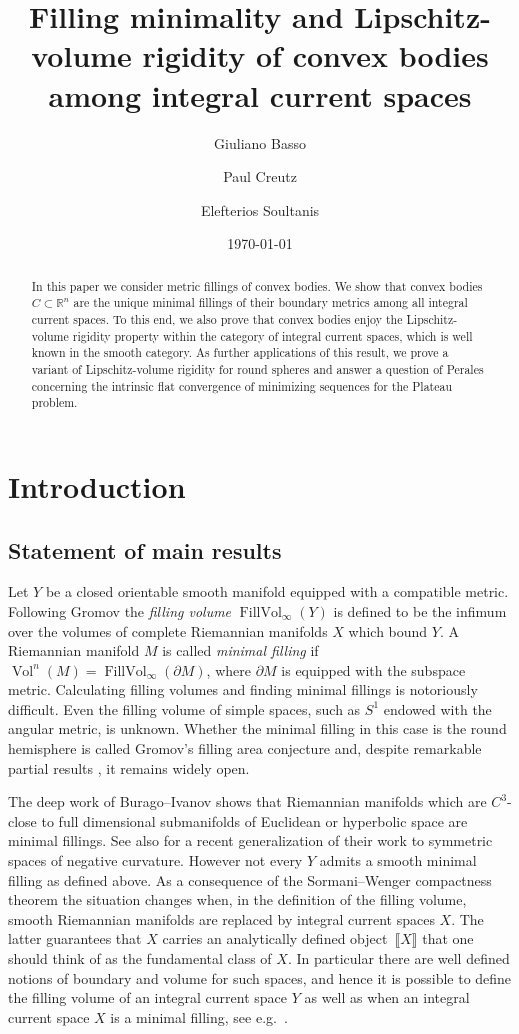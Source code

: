 \documentclass[reqno]{amsart}
\title[Filling minimality and rigidity of convex bodies]{Filling minimality and Lipschitz-volume rigidity of convex bodies among integral current spaces}
\author{Giuliano Basso}
\author{Paul Creutz}
\author{Elefterios Soultanis}
\date{\today}
\numberwithin{equation}{section}
\newcommand{\FillVol}{\operatorname{FillVol}}
\newcommand{\vol}{\operatorname{Vol}}
\newcommand{\bb}[1]{\llbracket #1\rrbracket}
\begin{document}
\begin{abstract}
In this paper we consider metric fillings of convex bodies. We show that convex bodies $C\subset \mathbb{R}^n$ are the unique minimal fillings of their boundary metrics among all integral current spaces. To this end, we also prove that convex bodies enjoy the Lipschitz-volume rigidity property within the category of integral current spaces, which is well known in the smooth category. As further applications of this result, we prove a variant of Lipschitz-volume rigidity for round spheres and answer a question of Perales concerning the intrinsic flat convergence of minimizing sequences for the Plateau problem.
\end{abstract}
\maketitle
\section{Introduction}
\subsection{Statement of main results}\label{sec:intro}
Let $Y$ be a closed orientable smooth manifold equipped with a compatible metric. Following Gromov \cite{gro87} the \emph{filling volume} $\FillVol_\infty(Y)$ is defined to be the infimum over the volumes of complete Riemannian manifolds $X$  which bound $Y$. A Riemannian manifold $M$ is called \emph{minimal filling} if $\vol^n(M)=\FillVol_\infty(\partial M)$, where $\partial M$ is equipped with the subspace metric. Calculating filling volumes and finding minimal fillings is notoriously difficult. Even the filling volume of simple spaces, such as $S^1$ endowed with the angular metric, is unknown. Whether the minimal filling in this case is the round hemisphere is called Gromov's filling area conjecture and, despite  remarkable partial results \cite{BCIK05, pu52, zust2021riemannian}, it remains widely open. 

The deep work of Burago--Ivanov \cite{bi10,bi13} shows that Riemannian manifolds which are $C^3$-close to full dimensional submanifolds of Euclidean or hyperbolic space are minimal fillings. See also \cite{ruan2022filling} for a recent generalization of their work to symmetric spaces of negative curvature. However not every $Y$ admits a smooth minimal filling as defined above. As a consequence of the Sormani–Wenger compactness theorem \cite{sw11} the situation changes when, in the definition of the filling volume, smooth Riemannian manifolds are replaced by integral current spaces $X$. The latter guarantees that $X$ carries an analytically defined object~$\bb{X}$ that one should think of as the fundamental class of $X$. In particular there are well defined notions of boundary and volume for such spaces, and hence it is possible to define the filling volume of an integral current space $Y$ as well as when an integral current space $X$ is a minimal filling, see e.g.\ \cite[Section 2.7]{ps17}.
\end{document}
